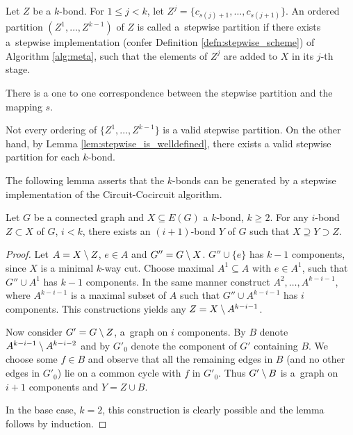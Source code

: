 \begin{defn}
	\label{defn:stepwise_partition}
	Let $Z$ be a $k$-bond. For $1 \leq j < k$, let $Z^{j} = \{c_{s(j)+1},\ldots,c_{s(j+1)}\}$. An ordered partition $(Z^1, \ldots, Z^{k-1})$ of $Z$ is called a~stepwise partition if there exists a~stepwise implementation (confer Definition \ref{defn:stepwise_scheme}) of Algorithm \ref{alg:meta}, such that the elements of $Z^j$ are added to $X$ in its $j$-th stage.
\end{defn}

\begin{rem}
	There is a one to one correspondence between the stepwise partition and the mapping $s$.
\end{rem}

\begin{rem}
	Not every ordering of $\{Z^1, \ldots, Z^{k-1}\}$ is a valid stepwise partition. On the other hand, by Lemma \ref{lem:stepwise_is_welldefined}, there exists a valid stepwise partition for each $k$-bond.
\end{rem}

The following lemma asserts that the $k$-bonds can be generated by a stepwise implementation of the Circuit-Cocircuit algorithm.

\begin{lem}
	\label{lem:stepwise_is_welldefined}
	Let $G$ be a connected graph and $X \subseteq E(G)$ a $k$-bond, $k \geq 2$.
	For any $i$-bond $Z \subset X$ of $G$, $i < k$, there exists an $(i+1)$-bond $Y$ of $G$ such that $X \supseteq Y \supset Z$.
\end{lem}

\begin{proof}
	Let $A = X \setminus Z$, $e \in A$ and $G'' = G \setminus X$. $G'' \cup \{e\}$ has $k-1$ components, since $X$ is a minimal $k$-way cut. Choose maximal $A^1 \subseteq A$ with $e \in A^1$, such that $G'' \cup A^1$ has $k-1$ components. In the same manner construct $A^2,\ldots,A^{k-i-1}$, where $A^{k-i-1}$ is a maximal subset of $A$ such that ${G'' \cup A^{k-i-1}}$ has $i$ components. This constructions yields any $Z = X \setminus A^{k-i-1}$.

	Now consider $G' = G \setminus Z$, a~graph on $i$ components. By $B$ denote \linebreak ${A^{k-i-1} \setminus A^{k-i-2}}$ and by $G'_0$ denote the component of $G'$ containing $B$. We choose some $f \in B$ and observe that all the remaining edges in $B$ (and no other edges in $G'_0$) lie on a common cycle with $f$ in $G'_0$. Thus $G' \setminus B$ is a~graph on $i+1$ components and $Y = Z \cup B$.

	In the base case, $k = 2$, this construction is clearly possible and the lemma follows by induction.
\end{proof}

